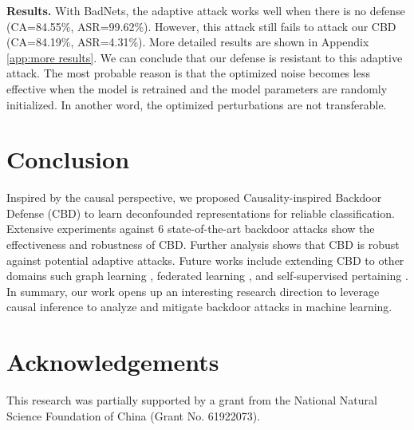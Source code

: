 \noindent \textbf{Results.}
With BadNets, the adaptive attack works well when there is no defense (CA=84.55\%, ASR=99.62\%). However, this attack still fails to attack our CBD (CA=84.19\%, ASR=4.31\%). More detailed results are shown in Appendix \ref{app:more results}. We can conclude that our defense is resistant to this adaptive attack.
The most probable reason is that the optimized noise becomes less effective when the model is retrained and the model parameters are randomly initialized. In another word, the optimized perturbations are not transferable.

\section{Conclusion}
Inspired by the causal perspective, we proposed Causality-inspired Backdoor Defense (CBD) to learn deconfounded representations for reliable classification. Extensive experiments against 6 state-of-the-art backdoor attacks show the effectiveness and robustness of CBD. Further analysis shows that CBD is robust against potential adaptive attacks. Future works include extending CBD to other domains such graph learning \cite{zhang2022hierarchical,zhang2022protgnn, zhang2021graphmi, zhang2022model}, federated learning \cite{cao2022flcert}, and self-supervised pertaining \cite{zhang2021motif, zhang2021graph}. In summary, our work opens up an interesting research direction to leverage causal inference to analyze and mitigate backdoor attacks in machine learning.

\section*{Acknowledgements}
This research was partially supported by a grant from the National Natural Science Foundation of China (Grant No. 61922073).

{\small
}

